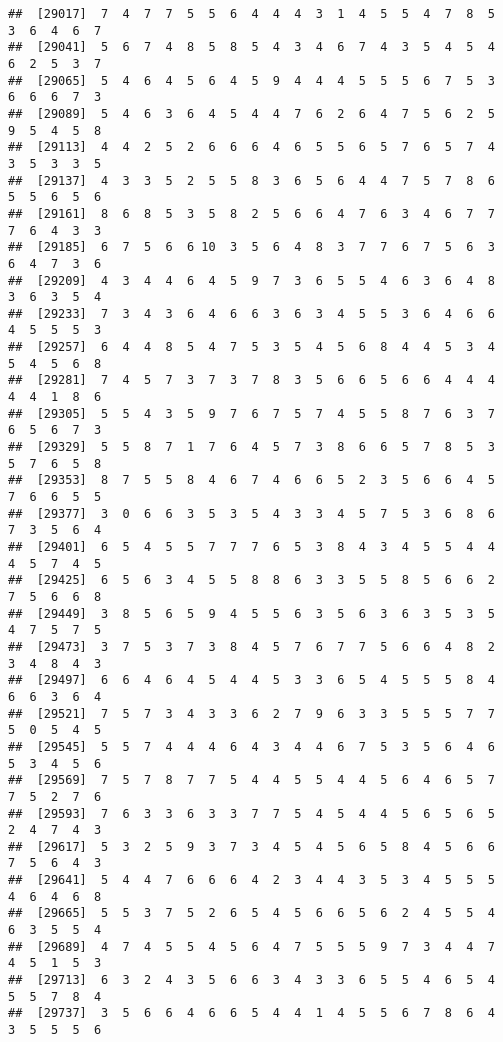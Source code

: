\documentclass[
]{book}
\begin{document}
\begin{verbatim}
##  [29017]  7  4  7  7  5  5  6  4  4  4  3  1  4  5  5  4  7  8  5  3  6  4  6  7
##  [29041]  5  6  7  4  8  5  8  5  4  3  4  6  7  4  3  5  4  5  4  6  2  5  3  7
##  [29065]  5  4  6  4  5  6  4  5  9  4  4  4  5  5  5  6  7  5  3  6  6  6  7  3
##  [29089]  5  4  6  3  6  4  5  4  4  7  6  2  6  4  7  5  6  2  5  9  5  4  5  8
##  [29113]  4  4  2  5  2  6  6  6  4  6  5  5  6  5  7  6  5  7  4  3  5  3  3  5
##  [29137]  4  3  3  5  2  5  5  8  3  6  5  6  4  4  7  5  7  8  6  5  5  6  5  6
##  [29161]  8  6  8  5  3  5  8  2  5  6  6  4  7  6  3  4  6  7  7  7  6  4  3  3
##  [29185]  6  7  5  6  6 10  3  5  6  4  8  3  7  7  6  7  5  6  3  6  4  7  3  6
##  [29209]  4  3  4  4  6  4  5  9  7  3  6  5  5  4  6  3  6  4  8  3  6  3  5  4
##  [29233]  7  3  4  3  6  4  6  6  3  6  3  4  5  5  3  6  4  6  6  4  5  5  5  3
##  [29257]  6  4  4  8  5  4  7  5  3  5  4  5  6  8  4  4  5  3  4  5  4  5  6  8
##  [29281]  7  4  5  7  3  7  3  7  8  3  5  6  6  5  6  6  4  4  4  4  4  1  8  6
##  [29305]  5  5  4  3  5  9  7  6  7  5  7  4  5  5  8  7  6  3  7  6  5  6  7  3
##  [29329]  5  5  8  7  1  7  6  4  5  7  3  8  6  6  5  7  8  5  3  5  7  6  5  8
##  [29353]  8  7  5  5  8  4  6  7  4  6  6  5  2  3  5  6  6  4  5  7  6  6  5  5
##  [29377]  3  0  6  6  3  5  3  5  4  3  3  4  5  7  5  3  6  8  6  7  3  5  6  4
##  [29401]  6  5  4  5  5  7  7  7  6  5  3  8  4  3  4  5  5  4  4  4  5  7  4  5
##  [29425]  6  5  6  3  4  5  5  8  8  6  3  3  5  5  8  5  6  6  2  7  5  6  6  8
##  [29449]  3  8  5  6  5  9  4  5  5  6  3  5  6  3  6  3  5  3  5  4  7  5  7  5
##  [29473]  3  7  5  3  7  3  8  4  5  7  6  7  7  5  6  6  4  8  2  3  4  8  4  3
##  [29497]  6  6  4  6  4  5  4  4  5  3  3  6  5  4  5  5  5  8  4  6  6  3  6  4
##  [29521]  7  5  7  3  4  3  3  6  2  7  9  6  3  3  5  5  5  7  7  5  0  5  4  5
##  [29545]  5  5  7  4  4  4  6  4  3  4  4  6  7  5  3  5  6  4  6  5  3  4  5  6
##  [29569]  7  5  7  8  7  7  5  4  4  5  5  4  4  5  6  4  6  5  7  7  5  2  7  6
##  [29593]  7  6  3  3  6  3  3  7  7  5  4  5  4  4  5  6  5  6  5  2  4  7  4  3
##  [29617]  5  3  2  5  9  3  7  3  4  5  4  5  6  5  8  4  5  6  6  7  5  6  4  3
##  [29641]  5  4  4  7  6  6  6  4  2  3  4  4  3  5  3  4  5  5  5  4  6  4  6  8
##  [29665]  5  5  3  7  5  2  6  5  4  5  6  6  5  6  2  4  5  5  4  6  3  5  5  4
##  [29689]  4  7  4  5  5  4  5  6  4  7  5  5  5  9  7  3  4  4  7  4  5  1  5  3
##  [29713]  6  3  2  4  3  5  6  6  3  4  3  3  6  5  5  4  6  5  4  5  5  7  8  4
##  [29737]  3  5  6  6  4  6  6  5  4  4  1  4  5  5  6  7  8  6  4  3  5  5  5  6

\end{verbatim}
\end{document}
